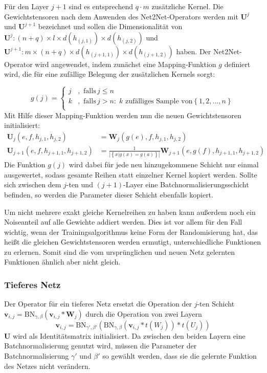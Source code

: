 Für den Layer $j+1$ sind es entsprechend $q \cdot m $ zusätzliche Kernel. Die Gewichtstensoren nach dem Anwenden des Net2Net-Operators werden mit $\mathbf{U}^j$ und $\mathbf{U}^{j+1}$ bezeichnet und sollen die Dimensionalität von $\mathbf{U}^j: (n+q) \times l \times d(h_{(j,1)}) \times d(h_{(j,2)})$ und $\mathbf{U}^{j+1}: m \times (n+q) \times d(h_{(j+1,1)}) \times d(h_{(j+1,2)})$ haben. Der Net2Net-Operator wird angewendet, indem zunächst eine Mapping-Funktion $g$ definiert wird, die für eine zufällige Belegung der zusätzlichen Kernels sorgt:

\begin{equation}
 g(j) =  
 \begin{cases}
 j & , \text{ falls} \, j \leq n \\
 k & , \text{ falls} \, j>n : \;  k \text{ zufälliges Sample von} \left\{ 1,2,\ldots, n \right\} \\ 
 \end{cases} 
 \end{equation}
 Mit Hilfe dieser Mapping-Funktion werden nun die neuen Gewichtstensoren initialisiert:
 \begin{align*}
 \mathbf{U}_j(e,f,h_{j,1},h_{j,2}) &= \mathbf{W}_j(g(e),f,h_{j,1},h_{j,2}) \\
 \mathbf{U}_{j+1}(e,f,h_{j+1,1},h_{j+1,2})&= \frac{1}{|\left\{ x | g(x)=g(a)\right\}|}\mathbf{W}_{j+1}(e,g(f),h_{j+1,1},h_{j+1,2})
 \end{align*}
Die Funktion $g(j)$ wird dabei für jede neu hinzugekommene Schicht nur einmal ausgewertet, sodass gesamte Reihen statt einzelner Kernel kopiert werden. Sollte sich zwischen dem $j$-ten und $(j+1)$-Layer eine Batchnormalisierungsschicht befinden, so werden die Parameter dieser Schicht ebenfalls kopiert.

Um nicht mehrere exakt gleiche Kernelreihen zu haben kann außerdem noch ein Noiseanteil auf alle Gewichte addiert werden. Dies ist vor allem für den Fall wichtig, wenn der Trainingsalgorithmus keine Form der Randomisierung hat, das heißt die gleichen Gewichtstensoren werden ermutigt, unterschiedliche Funktionen zu erlernen. Somit sind die vom ursprünglichen und neuen Netz gelernten Funktionen ähnlich aber nicht gleich.

\subsubsection{Tieferes Netz}

Der Operator für ein tieferes Netz ersetzt die Operation der $j$-ten Schicht $\mathbf{v}_{i,j} = \text{BN}_{\gamma,\beta}( \mathbf{v}_{i,j}* \mathbf{W}_{j})$ durch die Operation von zwei Layern  
\begin{equation}
\mathbf{v}_{i,j} =\text{BN}_{\gamma',\beta'}( \text{BN}_{\gamma,\beta}( \mathbf{v}_{i,j} * t(W_{j})) * t(U_{j})    )
\end{equation}
$\mathbf{U}$ wird als Identitätsmatrix initialisiert.
Da zwischen den beiden Layern eine Batchnormalisierung genutzt wird, müssen die Parameter der Batchnormalisierung $\gamma'$ und $\beta'$ so gewählt werden, dass sie die gelernte Funktion des Netzes nicht verändern.


